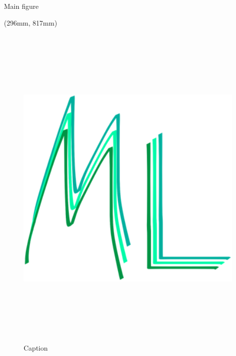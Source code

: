 \documentclass{beamer}
\begin{document}
\begin{frame}
\begin{textblock*}{514mm}
\begin{minipage}[t][569mm][t]{\textwidth}
\begin{block}{Main figure}
            \vfill
            \end{block}
        \end{minipage}
    \end{textblock*}
    
    
    \begin{textblock*}{249mm}(296mm, 817mm)
        \begin{minipage}[t][165mm][t]{\textwidth}
        
            \begin{figure}
                \centering
                \includegraphics[width=\textwidth, height=165mm, keepaspectratio]{images/logo-ml.png}
                \caption{Caption}
                \label{fig:subfigure1}
            \end{figure}
        \end{minipage}
    \end{textblock*}
    

\end{frame}
\end{document}
